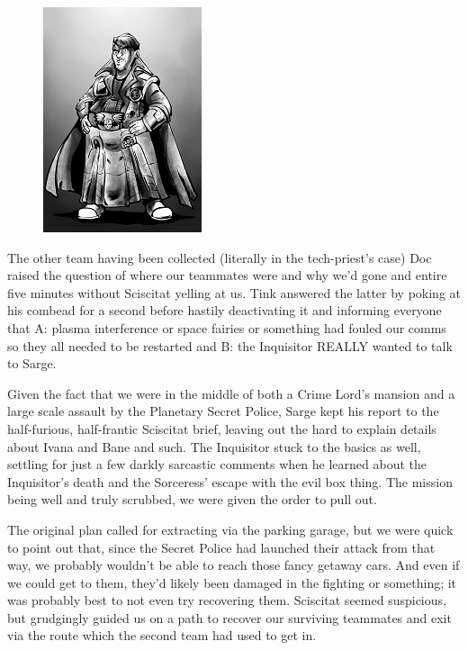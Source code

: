 \begin{figure}
	\begin{center}
		\includegraphics[width=\figwidth]{pics/19/5.png}
	\end{center}
\end{figure}
The other team having been collected (literally in the tech-priest's case) Doc raised the question of where our teammates were and why we'd gone and entire five minutes without Sciscitat yelling at us. 
Tink  answered the latter by poking at his combead for a second before hastily deactivating it and informing everyone that A: 
plasma interference or space fairies or something had fouled our comms so they all needed to be restarted and B: 
the Inquisitor REALLY wanted to talk to Sarge.

Given the fact that we were in the middle of both a Crime Lord's mansion and a large scale assault by the Planetary Secret Police, Sarge kept his report to the half-furious, half-frantic Sciscitat brief, leaving out the hard to explain details about Ivana and Bane and such. 
The Inquisitor stuck to the basics as well, settling for just a few darkly sarcastic comments when he learned about the Inquisitor's death and the Sorceress' escape with the evil box thing. 
The mission being well and truly scrubbed, we were given the order to pull out. 


The original plan called for extracting via the parking garage, but we were quick to point out that, since the Secret Police had launched their attack from that way, we probably wouldn't be able to reach those fancy getaway cars. 
And even if we could get to them, they'd likely been damaged in the fighting or something; 
it was probably best to not even try recovering them. 
Sciscitat seemed suspicious, but grudgingly guided us on a path to recover our surviving teammates and exit via the route which the second team had used to get in.

